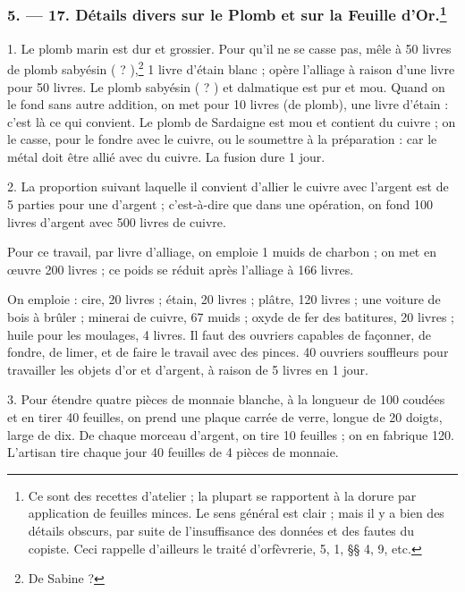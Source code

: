 \documentclass[a4paper, 11pt, oneside, polutonikogreek, french]{article}
\begin{document}
\bigskip
\centerline{\EightStarTaper}
\centerline{\EightStarTaper\EightStarTaper}
\bigskip

\subsubsection[5. --- 17. Détails divers sur le Plomb et sur la Feuille d'Or.]{5. --- 17. Détails divers sur le Plomb et sur la Feuille d'Or.\footnote{Ce sont des recettes d'atelier ; la plupart se rapportent à la dorure par application de feuilles minces. Le sens général est clair ; mais il y a bien des détails obscurs, par suite de l'insuffisance des données et des fautes du copiste. Ceci rappelle d'ailleurs le traité d'orfèvrerie, 5, 1, §§ 4, 9, etc.}}

1. Le plomb marin est dur et grossier. Pour qu'il ne se casse pas, mêle à 50 livres de plomb sabyésin ( ? ),\footnote{De Sabine ?} 1 livre d'étain blanc ; opère l'alliage à raison d'une livre pour 50 livres. Le plomb sabyésin ( ? ) et dalmatique est pur et mou. Quand on le fond sans autre addition, on met pour 10 livres (de plomb), une livre d'étain : c'est là ce qui convient. Le plomb de Sardaigne est mou et contient du cuivre ; on le casse, pour le fondre avec le cuivre, ou le soumettre à la préparation : car le métal doit être allié avec du cuivre. La fusion dure 1 jour.

2. La proportion suivant laquelle il convient d'allier le cuivre avec l'argent est de 5 parties pour une d'argent ; c'est-à-dire que dans une opération, on fond 100 livres d'argent avec 500 livres de cuivre.

Pour ce travail, par livre d'alliage, on emploie 1 muids de charbon ; on met en œuvre 200 livres ; ce poids se réduit après l'alliage à 166 livres.

On emploie : cire, 20 livres ; étain, 20 livres ; plâtre, 120 livres ; une voiture de bois à brûler ; minerai de cuivre, 67 muids ; oxyde de fer des batitures, 20 livres ; huile pour les moulages, 4 livres. Il faut des ouvriers capables de façonner, de fondre, de limer, et de faire le travail avec des pinces. 40 ouvriers souffleurs pour travailler les objets d'or et d'argent, à raison de 5 livres en 1 jour.

3. Pour étendre quatre pièces de monnaie blanche, à la longueur de 100 coudées et en tirer 40 feuilles, on prend une plaque carrée de verre, longue de 20 doigts, large de dix. De chaque morceau d'argent, on tire 10 feuilles ; on en fabrique 120. L'artisan tire chaque jour 40 feuilles de 4 pièces de monnaie.
\end{document}
